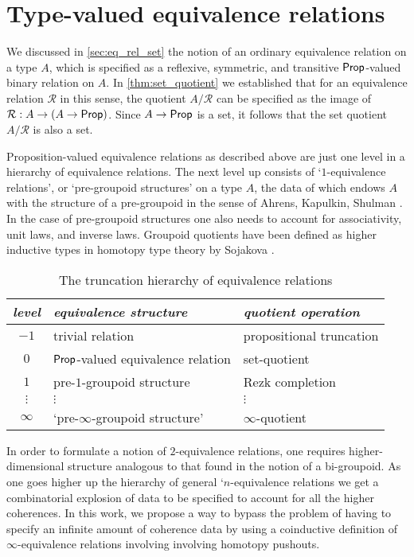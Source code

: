 \chapter{Type-valued equivalence relations}\label{chap:giraud}

We discussed in \cref{sec:eq_rel_set} the notion of an ordinary equivalence relation on a type $A$, which is specified as a reflexive, symmetric, and transitive $\mathsf{Prop}$-valued binary relation on $A$. In \cref{thm:set_quotient} we established that for an equivalence relation $\mathcal{R}$ in this sense, the quotient $A/\mathcal{R}$ can be specified as the image of $\mathcal{R}:A\to (A\to \mathsf{Prop})$. Since $A\to \mathsf{Prop}$ is a set, it follows that the set quotient $A/\mathcal{R}$ is also a set. 

Proposition-valued equivalence relations as described above are just one level in a hierarchy of equivalence relations. The next level up consists of `$1$-equivalence relations', or `pre-groupoid structures' on a type $A$, the data of which endows $A$ with the structure of a pre-groupoid in the sense of Ahrens, Kapulkin, Shulman \cite{AKS}. In the case of pre-groupoid structures one also needs to account for associativity, unit laws, and inverse laws. Groupoid quotients have been defined as higher inductive types in homotopy type theory by Sojakova \cite{SojakovaPhD}.

\begin{table}\label{tab:hierarchy}
\caption{The truncation hierarchy of equivalence relations}
\begin{tabular}{cll}
\toprule
\emph{level} & \emph{equivalence structure} & \emph{quotient operation} \\
\midrule
$-1$ & trivial relation & propositional truncation \\
$0$ & $\mathsf{Prop}$-valued equivalence relation & set-quotient \\
$1$ & pre-$1$-groupoid structure & Rezk completion \\
$\vdots$ & \qquad$\vdots$ & \qquad$\vdots$ \\
$\infty$ & `pre-$\infty$-groupoid structure' & $\infty$-quotient \\
\bottomrule
\end{tabular}
\end{table}

In order to formulate a notion of $2$-equivalence relations, one requires higher-dimensional structure analogous to that found in the notion of a bi-groupoid. As one goes higher up the hierarchy of general `$n$-equivalence relations we get a combinatorial explosion of data to be specified to account for all the higher coherences. In this work, we propose a way to bypass the problem of having to specify an infinite amount of coherence data by using a coinductive definition of $\infty$-equivalence relations involving involving homotopy pushouts.

